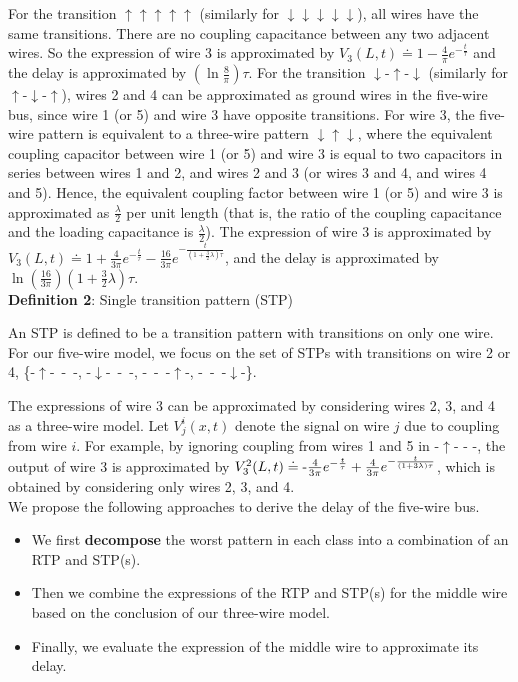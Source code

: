\documentclass[10pt,journal]{IEEEtran}
\begin{document}
For the transition $\uparrow \uparrow \uparrow \uparrow \uparrow$ (similarly for $\downarrow \downarrow \downarrow \downarrow \downarrow$), all wires have the same transitions. There are no coupling capacitance between any two adjacent wires. So the expression of wire 3 is approximated by
$V_3(L,t) \doteq 1-\frac{4}{\pi}e^{-\frac{t}{\tau}}$ and the delay is approximated by $\left(\ln{\frac{8}{\pi}}\right)\tau$. For the transition $\downarrow$-$\uparrow$-$\downarrow$ (similarly for $\uparrow$-$\downarrow$-$\uparrow$), wires 2 and 4 can be approximated as ground wires in the five-wire bus, since wire 1 (or 5) and wire 3 have opposite transitions. For wire 3, the five-wire pattern is equivalent to a three-wire pattern $\downarrow \uparrow \downarrow$, where the equivalent coupling capacitor between wire 1 (or 5) and wire 3 is equal to two capacitors in series between wires 1 and 2, and wires 2 and 3 (or wires 3 and 4, and wires 4 and 5).
Hence, the equivalent coupling factor between wire 1 (or 5) and wire 3 is approximated as $\frac{\lambda}{2}$ per unit length (that is, the ratio of the coupling capacitance and the loading capacitance is $\frac{\lambda}{2}$). The expression of wire 3 is approximated by $V_3(L,t) \doteq 1+\frac{4}{3\pi} e^{-\frac{t}{\tau}} - \frac{16}{3\pi} e^{-\frac{t}{(1+\frac{3}{2}\lambda)\tau}}$, and the delay is approximated by $\ln (\frac{16}{3\pi})(1+\frac{3}{2}\lambda)\tau$.\\

\textbf{Definition 2}: Single transition pattern (STP)

An STP is defined to be a transition pattern with transitions on only one wire. For our five-wire model, we focus on the set of STPs with transitions on wire 2 or 4, \{-$\uparrow$-~-~-, -$\downarrow$-~-~-, -~-~-$\uparrow$-, -~-~-$\downarrow$-\}.

The expressions of wire 3 can be approximated by considering wires 2, 3, and 4 as a three-wire model. Let $V^{i}_j(x,t)$ denote the signal on wire $j$ due to coupling from wire $i$. For example, by ignoring coupling from wires 1 and 5 in -$\uparrow$- - -, the output of wire 3 is approximated by  $V^{2}_{3}(L,t)\doteq \textnormal{-}\frac{4}{3\pi}e^{-\frac{t}{\tau}}+\frac{4}{3\pi}e^{-\frac{t}{(1+3\lambda)\tau}}$, which is obtained by considering only wires 2, 3, and 4.\\

We propose the following approaches to derive the delay of the five-wire bus.
\begin{itemize}
\item We first \textbf{decompose} the worst pattern in each class into a combination of an RTP and STP(s).
\item Then we combine the expressions of the RTP and STP(s) for the middle wire based on the conclusion of our three-wire model.
\item Finally, we evaluate the expression of the middle wire to approximate its delay.
\end{itemize}
\end{document}
